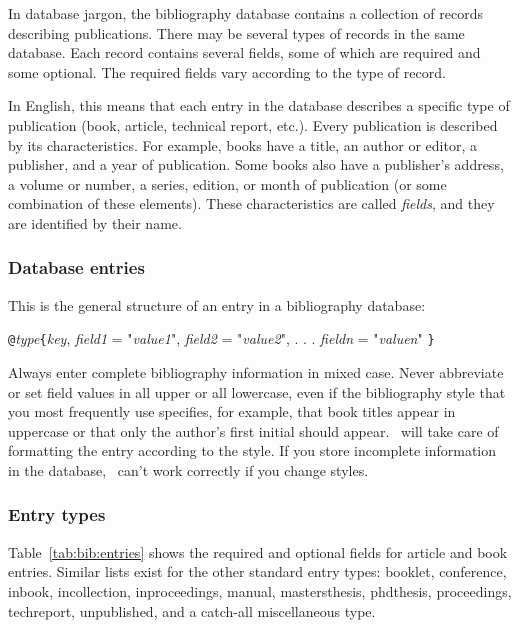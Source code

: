 In database jargon, the bibliography database contains a collection
of records describing publications.  There may be several
types of records in the same database.  Each record contains
several fields, some of which are required and some optional.  The
required fields vary according to the type of record.  

In English, this means that each entry in the database describes a
specific type of publication (book, article, technical report,
etc.).  Every publication is described by its characteristics.  For
example, books have a title, an author or editor, a publisher, and a
year of publication.  Some books also have a publisher's address, a
volume or number, a series, edition, or month of publication (or some
combination of these elements).  These characteristics are called
\textit{fields}, and they are identified by their name.

\subsubsection{Database entries}

This is the general 
structure of 
an entry in a bibliography database:

\begin{ttindent}
\verb|@|\textit{type}\verb|{|\textit{key},
    \textit{field1} = "\textit{value1}",
    \textit{field2} = "\textit{value2}",
    . . .
    \textit{fieldn} = "\textit{valuen}"
\verb|}|
\end{ttindent}

\newpage
Always enter complete bibliography information in mixed
case.  Never abbreviate or set field values in all upper or all lowercase, 
even if the bibliography style that you most frequently use
specifies, for example, that book titles appear in uppercase or that only
the author's first initial should appear.  \BibTeX\ will take care
of formatting the entry according to the style.  If you store incomplete
information in the database, \BibTeX\ can't work correctly if you change
styles.

\subsubsection{Entry types}

Table~\ref{tab:bib:entries} shows the required and optional fields for
article and book entries.  Similar lists exist for the other standard
entry types: booklet, conference, inbook, incollection, inproceedings,
manual, mastersthesis, phdthesis, proceedings, techreport, unpublished,
and a catch-all miscellaneous type.

